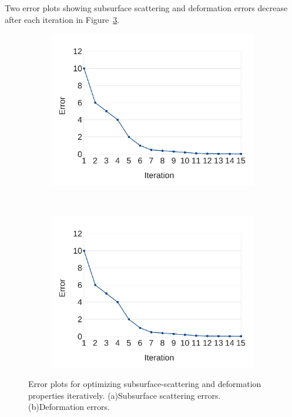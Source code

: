 \documentclass[annual]{acmsiggraph}
\begin{document}
Two error plots showing subsurface scattering and deformation errors decrease
after each iteration in Figure~\ref{fig:err}.

\begin{figure}
\begin{subfigure}[b]{0.3\textwidth}
	\centering
 	\includegraphics[width=\textwidth]{figure/error.pdf}
   	\caption{}
    \label{fig:ssErr}
    \end{subfigure}
    ~ 
    \begin{subfigure}[b]{0.3\textwidth}
    \centering
  	\includegraphics[width=\textwidth]{figure/error.pdf}
    \caption{}
    \label{fig:deformErr}
\end{subfigure}
\caption{Error plots for 
optimizing subsurface-scattering and deformation properties 
iteratively. (a)Subsurface scattering errors. (b)Deformation errors.}
\label{fig:err}
\end{figure}
\end{document}
